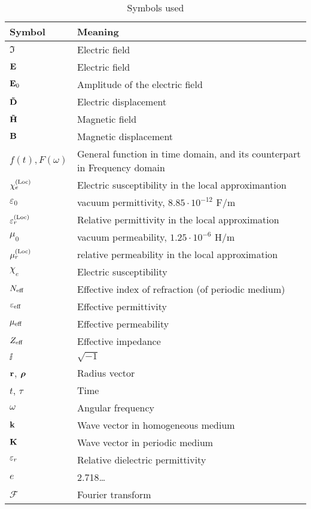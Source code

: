 \begin{table}[ht]   \caption{Symbols used}  \label{tb_symbols} \centering 
\begin{tabular}{ll}
 \toprule
Symbol & Meaning	\\
 \hline
$\Im$ 		& Electric field\\
$\mathbf{E}$ 		& Electric field\\
$\mathbf{E}_0$ 		& Amplitude of the electric field\\
$\mathbf{\tilde{D}}$ 		& Electric displacement\\
$\mathbf{\tilde{H}}$ 		& Magnetic field\\
$\mathbf{B}$ 		& Magnetic displacement\\
$f(t), F(\omega)$ & General function in time domain, and its counterpart in Frequency domain \\
$\chi_e^{\rm(Loc)}$ & Electric susceptibility in the local approximantion \\
$\varepsilon_0$ &vacuum permittivity, $8.85\cdot10^{-12}$ F/m\\
$\varepsilon^{\rm(Loc)}_r$ &Relative permittivity in the local approximation\\
$\mu_0$		&vacuum permeability, $1.25\cdot10^{-6}$ H/m \\
$\mu^{\rm(Loc)}_r$ &relative permeability in the local approximation\\
$\chi_e$ 	& Electric susceptibility\\
$N_{\text{eff} }$ 	& Effective index of refraction (of periodic medium)\\
$\varepsilon_{\text{eff} }$ 	& Effective permittivity\\
$\mu_{\text{eff} }$ 	& Effective permeability\\
$Z_{\text{eff} }$ 	& Effective impedance\\
$\ii$		& $\sqrt{-1}$\\
${\mathbf{r}}$, $\boldsymbol{\rho}$ 		& Radius vector\\
$t$, $\tau$ 		& Time\\
$\omega$ 	& Angular frequency\\
${\mathbf{k}}$ 		& Wave vector in homogeneous medium\\
${\mathbf{K}}$ 		& Wave vector in periodic medium\\
${\varepsilon_r}$ 	& Relative dielectric permittivity\\
$e$ 		& 2.718\ldots\\
$\mathcal F$ 		& Fourier transform\\
 \bottomrule
 \end{tabular} \end{table}
